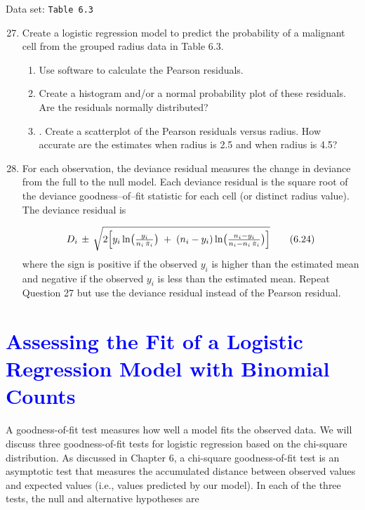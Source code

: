 \documentclass[
]{report}
\begin{document}
Data set: \texttt{Table\ 6.3}

\begin{enumerate}
  \setcounter{enumi}{26}
\item Create a logistic regression model to predict the probability of a malignant cell from the grouped radius data in Table 6.3.

\begin{enumerate}
  \item Use software to calculate the Pearson residuals.  
  \item Create a histogram and/or a normal probability plot of these residuals. Are the residuals normally distributed?  
  \item. Create a scatterplot of the Pearson residuals versus radius. How accurate are the estimates when radius is 2.5 and when radius is 4.5?
\end{enumerate}

\item For each observation, the deviance residual measures the change in deviance from the full to the null model. Each deviance residual is the square root of the deviance goodness–of–fit statistic for each cell (or distinct radius value). The deviance residual is

\begin{align}
D_i \,\pm\, \sqrt{2 \Bigl[
y_i \ln\bigl(\tfrac{y_i}{n_i\,\hat\pi_i}\bigr)
\;+\;(n_i - y_i)\ln\bigl(\tfrac{n_i - y_i}{n_i - n_i\,\hat\pi_i}\bigr)
\Bigr]}
\tag{6.24}
\end{align}
where the sign is positive if the observed $\scriptstyle y_i$ is higher than the estimated mean and negative if the observed $\scriptstyle y_i$ is less than the estimated mean. Repeat Question 27 but use the deviance residual instead of the Pearson residual.
\end{enumerate}

\hypertarget{section-73}{%
\section{\texorpdfstring{\textcolor{blue}{ Assessing the Fit of a Logistic Regression Model with Binomial Counts}}{}}\label{section-73}}

A goodness-of-fit test measures how well a model fits the observed data. We will discuss three goodness-of-fit tests for logistic regression based on the chi-square distribution. As discussed in Chapter 6, a chi-square goodness-of-fit test is an asymptotic test that measures the accumulated distance between observed values and expected values (i.e., values predicted by our model). In each of the three tests, the null and alternative hypotheses are
\end{document}
